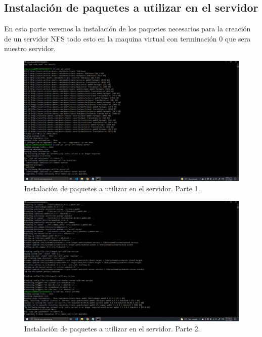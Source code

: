 \documentclass[11pt]{article}
\begin{document}
		\subsection{Instalación de paquetes a utilizar en el servidor}
		En esta parte veremos la instalación de los paquetes necesarios para la creación de un servidor NFS todo esto en la maquina virtual con terminación 0 que sera nuestro servidor.
		\begin{figure}[H]
			\centering
			\includegraphics[scale=0.34]{resources/instalandoservidor1.png}
			\caption{Instalación de paquetes a utilizar en el servidor. Parte 1.}\label{fig:picture}
		\end{figure}
		\begin{figure}[H]
			\centering
			\includegraphics[scale=0.34]{resources/instalandoservidor2.png}
			\caption{Instalación de paquetes a utilizar en el servidor. Parte 2.}\label{fig:picture}
		\end{figure}
\end{document}

